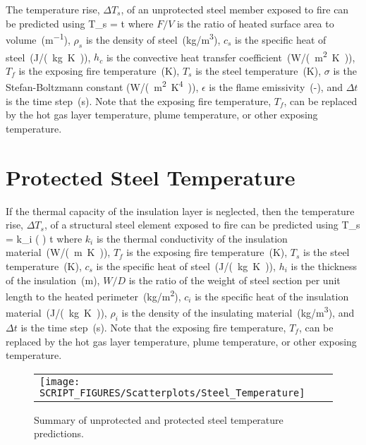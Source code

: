 The temperature rise, $\Delta T_s$, of an unprotected steel member exposed to fire can be predicted using
\be
\Delta T_s =    \Delta t
\label{eq:unprotected_steel}
\ee
where $F/V$ is the ratio of heated surface area to volume~(\si{m^{-1}}), $\rho_s$ is the density of steel~(\si{kg/m^3}), $c_s$ is the specific heat of steel~(\si{J/(kg.K)}), $h_c$ is the convective heat transfer coefficient~(\si{W/(m^2.K)}), $T_f$ is the exposing fire temperature~(\si{K}), $T_s$ is the steel temperature~(\si{K}), $\sigma$ is the Stefan-Boltzmann constant (\si{W/(m^2.K^4)}), $\epsilon$ is the flame emissivity~(-), and $\Delta t$ is the time step~(\si{s}). Note that the exposing fire temperature, $T_f$, can be replaced by the hot gas layer temperature, plume temperature, or other exposing temperature.


\section{Protected Steel Temperature}
\label{info:protected_steel_temperature}

If the thermal capacity of the insulation layer is neglected, then the temperature rise, $\Delta T_s$, of a structural steel element exposed to fire can be predicted using
\be
\Delta T_s = k_i \left(  \right) \Delta t
\label{eq:protected_steel}
\ee
where $k_i$ is the thermal conductivity of the insulation material~(\si{W/(m.K)}), $T_f$ is the exposing fire temperature~(\si{K}), $T_s$ is the steel temperature~(\si{K}), $c_s$ is the specific heat of steel~(\si{J/(kg.K)}), $h_i$ is the thickness of the insulation~(\si{m}), $W/D$ is the ratio of the weight of steel section per unit length to the heated perimeter~(\si{kg/m^2}), $c_i$ is the specific heat of the insulation material~(\si{J/(kg.K)}), $\rho_i$ is the density of the insulating material~(\si{kg/m^3}), and $\Delta t$ is the time step~(\si{s}). Note that the exposing fire temperature, $T_f$, can be replaced by the hot gas layer temperature, plume temperature, or other exposing temperature.

\begin{figure}[!ht]
\begin{center}
\begin{tabular}{l}
\texttt{[image: SCRIPT\_FIGURES/Scatterplots/Steel\_Temperature]}
\end{tabular}
\end{center}
\caption[Summary of steel temperature predictions]
{Summary of unprotected and protected steel temperature predictions.}
\label{Surface_Temperature_Steel_Summary}
\end{figure}

